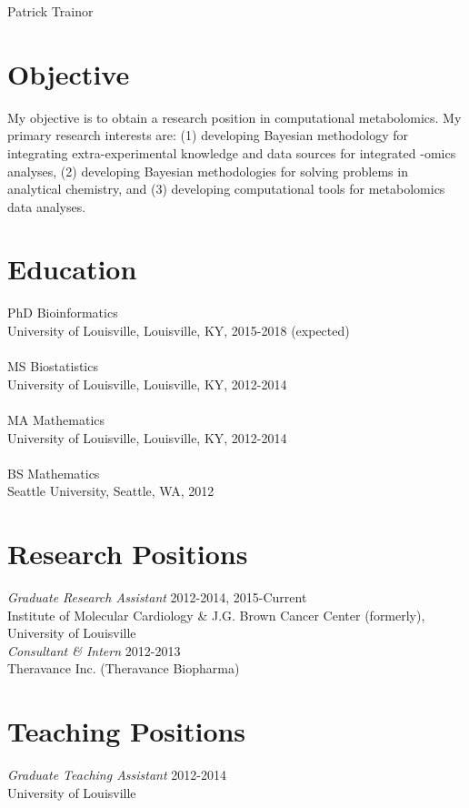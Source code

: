 \begin{center}
Patrick Trainor 
\end{center}

\bigskip
{\parindent0pt

\section*{Objective}
My objective is to obtain a research position in computational metabolomics. My primary research interests are: (1) developing Bayesian methodology for integrating extra-experimental knowledge and data sources for integrated -omics analyses, (2) developing Bayesian methodologies for solving problems in analytical chemistry, and (3) developing computational tools for metabolomics data analyses.  

\section*{Education}
 PhD Bioinformatics  \\
University of Louisville, Louisville, KY, 2015-2018 (expected)  \\ \\
 MS Biostatistics  \\
University of Louisville, Louisville, KY, 2012-2014  \\ \\
MA Mathematics  \\
University of Louisville, Louisville, KY, 2012-2014 \\ \\
BS Mathematics  \\
Seattle University, Seattle, WA, 2012

\section*{Research Positions}
\emph{Graduate Research Assistant} \hfill 2012-2014, 2015-Current \\
Institute of Molecular Cardiology \& J.G. Brown Cancer Center (formerly), University of Louisville \\

\emph{Consultant \& Intern} \hfill 2012-2013 \\
Theravance Inc. (Theravance Biopharma) 

\section*{Teaching Positions}
\emph{Graduate Teaching Assistant} \hfill 2012-2014 \\
University of Louisville \\

}

